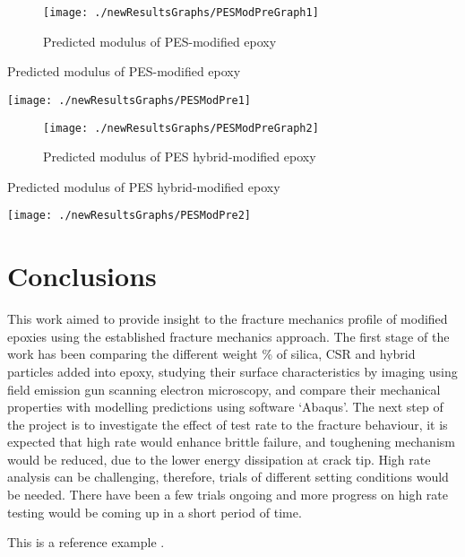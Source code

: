\documentclass[numbers=noendperiod,chapterprefix=on]{icldt} %
\begin{document}
\begin{figure}[!t]
\centering
\texttt{[image: ./newResultsGraphs/PESModPreGraph1]}
\caption{Predicted modulus of PES-modified epoxy}
\end{figure}
\FloatBarrier

\begin{table}[!htpb]
\centering
\caption{Predicted modulus of PES-modified epoxy} %
\texttt{[image: ./newResultsGraphs/PESModPre1]}
\end{table}
\FloatBarrier

\begin{figure}[!hp]
\centering
\texttt{[image: ./newResultsGraphs/PESModPreGraph2]}
\caption{Predicted modulus of PES hybrid-modified epoxy}
\end{figure}
\FloatBarrier

\begin{table}[!htpb]
\centering
\caption{Predicted modulus of PES hybrid-modified epoxy} %
\texttt{[image: ./newResultsGraphs/PESModPre2]}
\end{table}
\FloatBarrier








\section{Conclusions}
This work aimed to provide insight to the fracture mechanics profile of modified epoxies using the established fracture mechanics approach. The first stage of the work has been comparing the different weight \% of silica, CSR and hybrid particles added into epoxy, studying their surface characteristics by imaging using field emission gun scanning electron microscopy, and compare their mechanical properties with modelling predictions using software ‘Abaqus’.
The next step of the project is to investigate the effect of test rate to the fracture behaviour, it is expected that high rate would enhance brittle failure, and toughening mechanism would be reduced, due to the lower energy dissipation at crack tip. High rate analysis can be challenging, therefore, trials of different setting conditions would be needed. There have been a few trials ongoing and more progress on high rate testing would be coming up in a short period of time.

This is a reference example \cite{Blackman1996a}.
\end{document}
